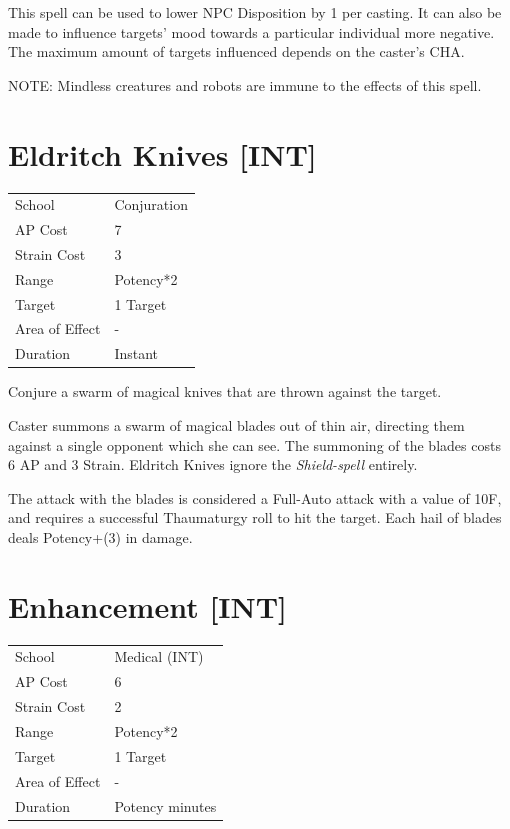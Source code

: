 \documentclass[11pt,a4paper,twocolumn]{book}
\begin{document}
This spell can be used to lower NPC Disposition by 1 per casting. It can also be made to influence targets' mood towards a particular individual more negative. The maximum amount of targets influenced depends on the caster's CHA.

NOTE: Mindless creatures and robots are immune to the effects of this spell.


\section*{Eldritch Knives [INT]}
{
	\begin{tabu} to 75mm{| X[l,4] | X[l,7] |}
		\hline
		School 			& Conjuration 			\\
        AP Cost	      	& 7 					\\
        Strain Cost     & 3 					\\
        Range     		& Potency*2 			\\
        Target      	& 1 Target				\\
        Area of Effect  & -  	 				\\
        Duration     	& Instant 				\\ \hline
	\end{tabu}
		
}

\medskip

Conjure a swarm of magical knives that are thrown against the target.

Caster summons a swarm of magical blades out of thin air, directing them against a single opponent which she can see.  The summoning of the blades costs 6 AP and 3 Strain. Eldritch Knives ignore the \textit{Shield-spell} entirely.

The attack with the blades is considered a Full-Auto attack with a value of 10F, and requires a successful Thaumaturgy roll to hit the target. Each hail of blades deals Potency+(3) in damage.

\vfill


\section*{Enhancement [INT]}
{
	\begin{tabu} to 75mm{| X[l,4] | X[l,7] |}
		\hline
		School 			& Medical (INT) 		\\
        AP Cost	      	& 6 					\\
        Strain Cost     & 2 					\\
        Range     		& Potency*2 			\\
        Target      	& 1 Target				\\
        Area of Effect  & -  	 				\\
        Duration     	& Potency minutes 		\\ \hline
	\end{tabu}
		
}
\end{document}
